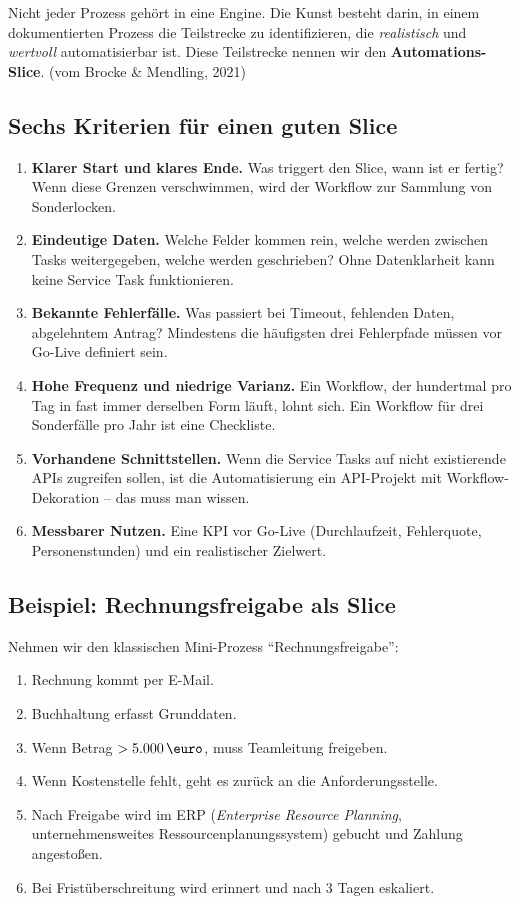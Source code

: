 \documentclass[11pt,a4paper,oneside]{article}
\newcommand{\fachbegriff}[1]{\textbf{#1}}
\newcommand{\quelle}[1]{{\footnotesize\color{lpGray}(#1)}}
\begin{document}
Nicht jeder Prozess gehört in eine Engine. Die Kunst besteht darin, in einem dokumentierten Prozess die Teilstrecke zu identifizieren, die \emph{realistisch} und \emph{wertvoll} automatisierbar ist. Diese Teilstrecke nennen wir den \fachbegriff{Automations-Slice}. \quelle{vom Brocke \& Mendling, 2021}

\subsection{Sechs Kriterien für einen guten Slice}

\begin{enumerate}
  \item \textbf{Klarer Start und klares Ende.} Was triggert den Slice, wann ist er fertig? Wenn diese Grenzen verschwimmen, wird der Workflow zur Sammlung von Sonderlocken.
  \item \textbf{Eindeutige Daten.} Welche Felder kommen rein, welche werden zwischen Tasks weitergegeben, welche werden geschrieben? Ohne Datenklarheit kann keine Service Task funktionieren.
  \item \textbf{Bekannte Fehlerfälle.} Was passiert bei Timeout, fehlenden Daten, abgelehntem Antrag? Mindestens die häufigsten drei Fehlerpfade müssen vor Go-Live definiert sein.
  \item \textbf{Hohe Frequenz und niedrige Varianz.} Ein Workflow, der hundertmal pro Tag in fast immer derselben Form läuft, lohnt sich. Ein Workflow für drei Sonderfälle pro Jahr ist eine Checkliste.
  \item \textbf{Vorhandene Schnittstellen.} Wenn die Service Tasks auf nicht existierende APIs zugreifen sollen, ist die Automatisierung ein API-Projekt mit Workflow-Dekoration -- das muss man wissen.
  \item \textbf{Messbarer Nutzen.} Eine KPI vor Go-Live (Durchlaufzeit, Fehlerquote, Personenstunden) und ein realistischer Zielwert.
\end{enumerate}

\subsection{Beispiel: Rechnungsfreigabe als Slice}

Nehmen wir den klassischen Mini-Prozess ``Rechnungsfreigabe'':

\begin{enumerate}
  \item Rechnung kommt per E-Mail.
  \item Buchhaltung erfasst Grunddaten.
  \item Wenn Betrag $> 5.000\,\text{\euro}$, muss Teamleitung freigeben.
  \item Wenn Kostenstelle fehlt, geht es zurück an die Anforderungsstelle.
  \item Nach Freigabe wird im ERP (\emph{Enterprise Resource Planning}, unternehmensweites Ressourcenplanungssystem) gebucht und Zahlung angestoßen.
  \item Bei Fristüberschreitung wird erinnert und nach 3 Tagen eskaliert.
\end{enumerate}
\end{document}
